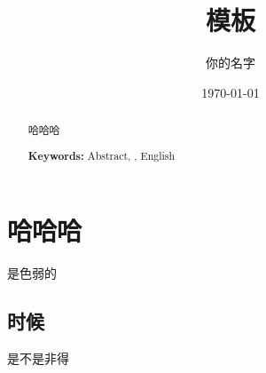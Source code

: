 \documentclass[UTF8,a4paper,10pt]{article}
\begin{document}
\title{模板}
\author{你的名字}
\date{\today}
\maketitle{}
\begin{abstract}
	哈哈哈
	
\centering
\textbf{Keywords:} Abstract, \LaTeXe, English

\end{abstract}



\newpage
\tableofcontents

\section{哈哈哈}
是色弱的
    \subsection{时候}
是不是非得
\end{document}
